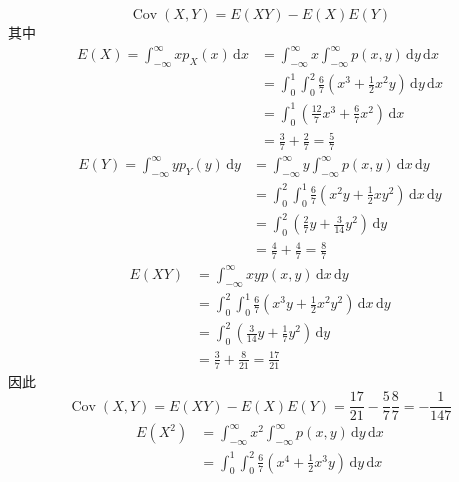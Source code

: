 \documentclass[../main.tex]{subfiles}
\begin{document}
\begin{solution}
   \[
   \operatorname{Cov}\left( X,Y \right)= E\left( XY \right)-E\left( X \right)E\left( Y \right)    
   \] 其中 \[
  \begin{aligned}
   E\left( X \right)= \int_{-\infty}^{\infty}xp_{X}\left( x \right)\,\mathrm{d} x&=  \int_{-\infty}^{\infty} x\int_{-\infty}^{\infty}p\left( x,y \right)\,\mathrm{d} y\,\mathrm{d} x   \\ 
    &=  \int_{0}^{1}\int_{0}^{2}\frac{6}{7}\left( x^{3}+ \frac{1 }{2 }x^{2}y  \right)\,\mathrm{d} y\,\mathrm{d} x\\ 
     &= \int_{0}^{1}\left( \frac{12 }{7 }x^{3}+ \frac{6 }{7 }x^{2}   \right)\,\mathrm{d} x\\ 
      &= \frac{3 }{7 }+ \frac{2 }{7 }= \frac{5 }{7 }     
  \end{aligned}
   \] \[
   \begin{aligned}
   E\left( Y \right)= \int_{-\infty}^{\infty}yp_{Y}\left( y \right)\,\mathrm{d} y&= \int_{-\infty}^{\infty}y \int_{-\infty}^{\infty}p\left( x,y \right)\,\mathrm{d} x\,\mathrm{d} y\\ 
    &= \int_{0}^{2}\int_{0}^{1}\frac{6}{7}\left( x^{2}y+ \frac{1 }{2 }xy^{2}  \right)\,\mathrm{d} x\,\mathrm{d} y\\ 
     &= \int_{0}^{2}\left( \frac{2 }{7 }y+ \frac{3 }{14 }y^{2}   \right)\,\mathrm{d} y\\ 
      &= \frac{4}{7}+ \frac{4}{7}= \frac{8 }{7 }       
   \end{aligned}
   \]\[
  \begin{aligned}
   E\left( XY \right)&=  \int_{-\infty}^{\infty}xyp\left( x,y \right)  \,\mathrm{d} x\,\mathrm{d} y \\ 
    &= \int_{0}^{2}\int_{0}^{1}\frac{6}{7}\left( x^{3}y+ \frac{1 }{2 }x^{2}y^{2}  \right) \,\mathrm{d} x\,\mathrm{d} y\\ 
     &= \int_{0}^{2}\left( \frac{3 }{14 }y+ \frac{1}{7}y^{2} \right) \,\mathrm{d} y \\ 
      &= \frac{3}{7}+ \frac{8 }{21 }= \frac{17 }{21 }  
  \end{aligned}
   \] 因此 \[
   \operatorname{Cov}\left( X,Y \right)= E\left( XY \right)-E\left( X \right)E\left( Y \right)= \frac{17}{21}- \frac{5}{7} \frac{8}{7}= -\frac{1}{147}    
   \] \[
   \begin{aligned}
   E\left( X^{2} \right)&= \int_{-\infty}^{\infty}x^{2}\int_{-\infty}^{\infty}p\left( x,y \right)\,\mathrm{d} y\,\mathrm{d} x\\ 
    &= \int_{0}^{1}\int_{0}^{2}\frac{6}{7}\left( x^{4}+ \frac{1 }{2 }x^{3}y  \right)\,\mathrm{d} y\,\mathrm{d} x\\ 

\end{aligned}\]
\end{solution}
\end{document}
